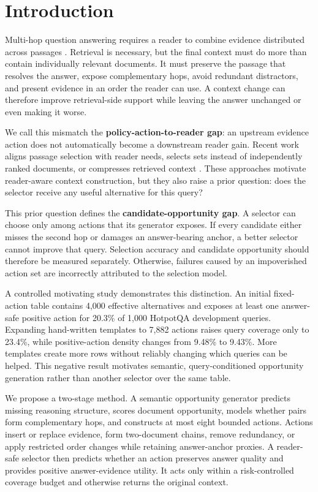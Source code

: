 \section{Introduction}

Multi-hop question answering requires a reader to combine evidence distributed across passages \citep{yang-etal-2018-hotpotqa,ho-etal-2020-2wiki}. Retrieval is necessary, but the final context must do more than contain individually relevant documents. It must preserve the passage that resolves the answer, expose complementary hops, avoid redundant distractors, and present evidence in an order the reader can use. A context change can therefore improve retrieval-side support while leaving the answer unchanged or even making it worse.

We call this mismatch the \textbf{policy-action-to-reader gap}: an upstream evidence action does not automatically become a downstream reader gain. Recent work aligns passage selection with reader needs, selects sets instead of independently ranked documents, or compresses retrieved context \citep{xin-etal-2025-rcps,lee-etal-2025-setr,xu-etal-2024-recomp}. These approaches motivate reader-aware context construction, but they also raise a prior question: does the selector receive any useful alternative for this query?

This prior question defines the \textbf{candidate-opportunity gap}. A selector can choose only among actions that its generator exposes. If every candidate either misses the second hop or damages an answer-bearing anchor, a better selector cannot improve that query. Selection accuracy and candidate opportunity should therefore be measured separately. Otherwise, failures caused by an impoverished action set are incorrectly attributed to the selection model.

A controlled motivating study demonstrates this distinction. An initial fixed-action table contains 4,000 effective alternatives and exposes at least one answer-safe positive action for 20.3\% of 1,000 HotpotQA development queries. Expanding hand-written templates to 7,882 actions raises query coverage only to 23.4\%, while positive-action density changes from 9.48\% to 9.43\%. More templates create more rows without reliably changing which queries can be helped. This negative result motivates semantic, query-conditioned opportunity generation rather than another selector over the same table.

We propose a two-stage method. A semantic opportunity generator predicts missing reasoning structure, scores document opportunity, models whether pairs form complementary hops, and constructs at most eight bounded actions. Actions insert or replace evidence, form two-document chains, remove redundancy, or apply restricted order changes while retaining answer-anchor proxies. A reader-safe selector then predicts whether an action preserves answer quality and provides positive answer-evidence utility. It acts only within a risk-controlled coverage budget and otherwise returns the original context.

